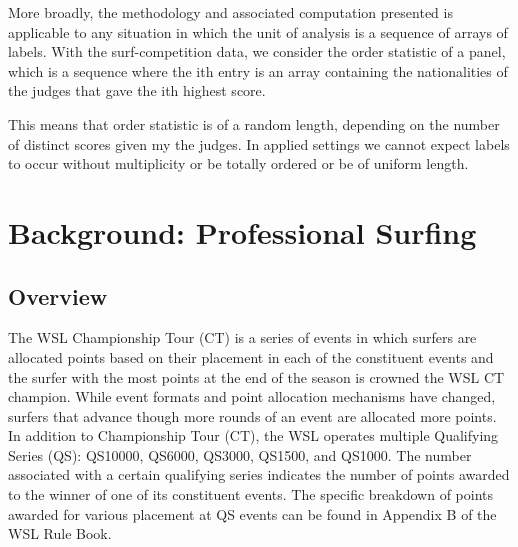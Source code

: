 \documentclass{article}
\begin{document}
More broadly, the methodology and associated computation presented is applicable to any situation in which the unit of analysis is a sequence of arrays of labels. With the surf-competition data, we consider the order statistic of a panel, which is a sequence where the ith entry is an array containing the nationalities of the judges that gave the ith highest score.

This means that order statistic is of a random length, depending on the number of distinct scores given my the judges. In applied settings we cannot expect labels to occur without multiplicity or be totally ordered or be of uniform length.


\section{Background: Professional Surfing}

\subsection{Overview}
The WSL Championship Tour (CT) is a series of events in which surfers are allocated points based on their placement in each of the constituent events and the surfer with the most points at the end of the season is crowned the WSL CT champion. While event formats and point allocation mechanisms have changed, surfers that advance though more rounds of an event are allocated more points. In addition to Championship Tour (CT), the WSL operates multiple Qualifying Series (QS): QS10000, QS6000, QS3000, QS1500, and QS1000. The number associated with a certain qualifying series indicates the number of points awarded to the winner of one of its constituent events. The specific breakdown of points awarded for various placement at QS events can be found in Appendix B of the WSL Rule Book.
\end{document}
